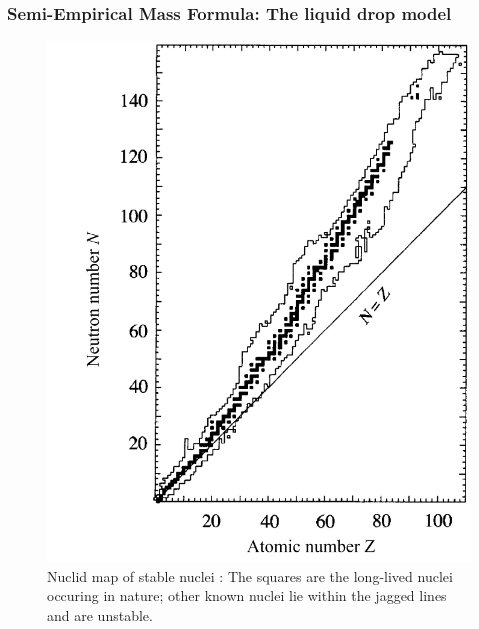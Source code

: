 \subsubsection{Semi-Empirical Mass Formula: The liquid drop model}
\begin{figure}[htpb]
    \centering
    \includegraphics[width=0.6\linewidth]{figures/nuclidmap}
    \caption{Nuclid map of stable nuclei \cite{Hooshyar}: The squares are the long-lived nuclei
    occuring in nature; other known nuclei lie within the jagged lines and are unstable.}
    \label{fig:nuclidmap}
\end{figure}
\label{ssub:Semi-Empirical Mass Formula: The Liquid Drop Model}
